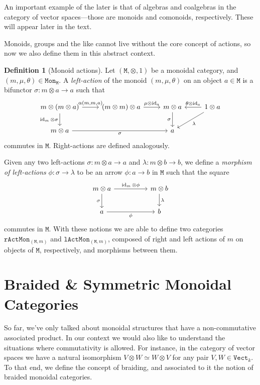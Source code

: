 \documentclass[11pt, reqno]{amsart}
\theoremstyle{definition}
\newtheorem{definition}[theorem]{Definition}
\newcommand{\iso}{\simeq}
\newcommand{\cat}{\texttt}
\newcommand{\catfont}{\texttt}
\newcommand{\Vect}{{\catfont{Vect}}}        %
\newcommand{\Mon}{{\catfont{Mon}}}          %
\newcommand{\rActMon}{{\catfont{rActMon}}}  %
\newcommand{\lActMon}{{\catfont{lActMon}}}  %
\DeclareMathOperator{\Id}{id}     %
\begin{document}
An important example of the later is that of algebras and coalgebras in
the category of vector spaces---those are monoids and comonoids,
respectively. These will appear later in the text.

Monoids, groups and the like cannot live without the core concept of actions, so
now we also define them in this abstract context.

\begin{definition}[Monoid actions]
\label{def:monoid-actions}
Let \((\cat M, \otimes, 1)\) be a monoidal category, and
\((m, \mu, \theta) \in \Mon_{\cat M}\). A \emph{left-action} of the monoid
\((m, \mu, \theta)\) on an object \(a \in \cat M\) is a bifunctor
\(\sigma: m \otimes a \to a\) such that
\[
\begin{tikzcd}
m \otimes (m \otimes a)
\ar[r, "{\alpha(m, m, a)}"]
\ar[d, "\Id_m \otimes \sigma"']
&(m \otimes m) \otimes a
\ar[r, "\mu \otimes \Id_a"]
&m \otimes a
\ar[d, "\sigma"']
&1 \otimes a
\ar[l, "\theta \otimes \Id_a"']
\ar[ld, "\lambda"]
\\
m \otimes a \ar[rr, "\sigma"']
&
&a
&
\end{tikzcd}
\]
commutes in \(\cat M\). Right-actions are defined analogously.

Given any two left-actions \(\sigma: m \otimes a \to a\) and
\(\lambda: m \otimes b \to b\), we define a \emph{morphism of left-actions}
\(\phi: \sigma \to \lambda\) to be an arrow \(\phi: a \to b\) in \(\cat M\) such
that the square
\[
\begin{tikzcd}
m \otimes a
\ar[d, "\sigma"']
\ar[rr, "\Id_m \otimes \phi"]
&&m \otimes b \ar[d, "\lambda"]
\\
a \ar[rr, "\phi"']
&&b
\end{tikzcd}
\]
commutes in \(\cat M\). With these notions we are able to define two categories
\(\rActMon_{(\cat M, m)}\) and \(\lActMon_{(\cat M, m)}\), composed of right and
left actions of \(m\) on objects of \(\cat M\), respectively, and morphisms
between them.
\end{definition}

\section{Braided \& Symmetric Monoidal Categories}

So far, we've only talked about monoidal structures that have a non-commutative
associated product. In our context we would also like to understand the
situations where commutativity is allowed. For instance, in the category of
vector spaces we have a natural isomorphism \(V \otimes W \iso W \otimes V\) for
any pair \(V, W \in \Vect_k\). To that end, we define the concept of braiding,
and associated to it the notion of braided monoidal categories.
\end{document}
